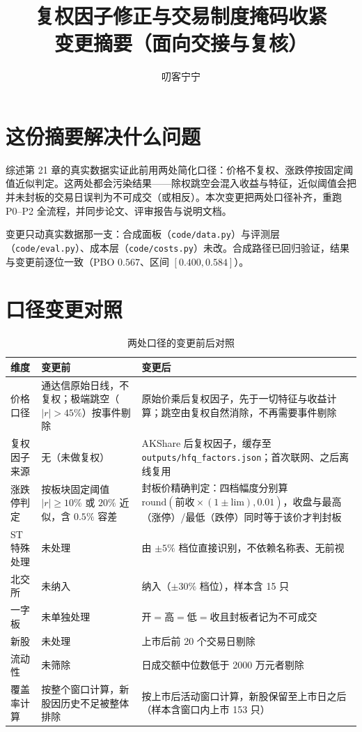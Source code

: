 \documentclass[11pt,a4paper]{ctexart}
\title{\bfseries 复权因子修正与交易制度掩码收紧\\\large 变更摘要（面向交接与复核）}
\author{\large 叨客宁宁}
\date{}
\begin{document}
\maketitle

\section{这份摘要解决什么问题}

综述第 21 章的真实数据实证此前用两处简化口径：价格不复权、涨跌停按固定阈值近似判定。这两处都会污染结果——除权跳空会混入收益与特征，近似阈值会把并未封板的交易日误判为不可成交（或相反）。本次变更把两处口径补齐，重跑 P0--P2 全流程，并同步论文、评审报告与说明文档。

变更只动真实数据那一支：合成面板（\texttt{code/data.py}）与评测层（\texttt{code/eval.py}）、成本层（\texttt{code/costs.py}）未改。合成路径已回归验证，结果与变更前逐位一致（PBO $0.567$、区间 $[0.400,0.584]$）。

\section{口径变更对照}

\begin{table}[htbp]
\centering
\caption{两处口径的变更前后对照}
\label{tab:caliber}
\begin{tabular}{@{}>{\raggedright\arraybackslash}p{2.8cm}>{\raggedright\arraybackslash}p{5.4cm}>{\raggedright\arraybackslash}p{6.2cm}@{}}
\toprule
维度 & 变更前 & 变更后 \\
\midrule
价格口径 & 通达信原始日线，不复权；极端跳空（$|r|>45\%$）按事件剔除 & 原始价乘后复权因子，先于一切特征与收益计算；跳空由复权自然消除，不再需要事件剔除 \\
\addlinespace
复权因子来源 & 无（未做复权） & AKShare 后复权因子，缓存至 \texttt{outputs/hfq\_factors.json}；首次联网、之后离线复用 \\
\addlinespace
涨跌停判定 & 按板块固定阈值 $|r| \ge 10\%$ 或 $20\%$ 近似，含 $0.5\%$ 容差 & 封板价精确判定：四档幅度分别算 $\text{round}(\text{前收}\times(1\pm\text{lim}),0.01)$，收盘与最高（涨停）/最低（跌停）同时等于该价才判封板 \\
\addlinespace
ST 特殊处理 & 未处理 & 由 $\pm5\%$ 档位直接识别，不依赖名称表、无前视 \\
\addlinespace
北交所 & 未纳入 & 纳入（$\pm30\%$ 档位），样本含 15 只 \\
\addlinespace
一字板 & 未单独处理 & 开$=$高$=$低$=$收且封板者记为不可成交 \\
\addlinespace
新股 & 未处理 & 上市后前 20 个交易日剔除 \\
\addlinespace
流动性 & 未筛除 & 日成交额中位数低于 2000 万元者剔除 \\
\addlinespace
覆盖率计算 & 按整个窗口计算，新股因历史不足被整体排除 & 按上市后活动窗口计算，新股保留至上市日之后（样本含窗口内上市 153 只） \\
\bottomrule
\end{tabular}
\end{table}
\end{document}
